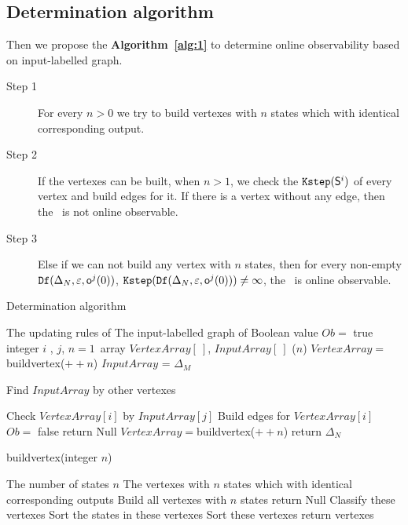  \subsection{Determination algorithm}
 Then we propose the {\bf Algorithm~\ref{alg:1}} to determine online observability based on input-labelled graph.%

\begin{description}
\item[Step 1]  For every $n>0$ we try to build vertexes with $n$ states which with identical corresponding output. 
\item[Step 2] If the vertexes can  be built, when $n>1$, we check the ${\tt Kstep}(\mathsf{S}^i)$ of every vertex and build edges for it. If there is a vertex without any edge, then the \BCN\ is not online observable.
\item[Step 3] Else if we can not build any vertex with $n$ states, then  for every non-empty ${\tt Df}(\Delta_N,\varepsilon, \mathsf{o}^{j}(0))$, ${\tt Kstep}({\tt Df}(\Delta_N,\varepsilon, \mathsf{o}^{j}(0)))\ne\infty$, the \BCN\ is online observable.
 \end{description}

\begin{algorithm}[h]
\caption{Determination algorithm}
\begin{algorithmic}[1]
\REQUIRE 
The updating rules of \BCN
\ENSURE  
The input-labelled graph of \BCN
\STATE Boolean value $Ob=$ true 
\STATE integer $i$ , $j$, $n=1$\
\STATE array $VertexArray[\ ]$, $InputArray[\ ]$
($n$)
\STATE $VertexArray=${\sf buildvertex}($++n$)
\STATE $InputArray$ = $\Delta_M$ 
\ELSE

\STATE Find $InputArray$ by other vertexes

\ENDIF
{}
\STATE Check $VertexArray[i]$ by $InputArray[j]$ 
\STATE Build edges for $VertexArray[i]$ 
\ENDFOR
{}
\STATE  $Ob=$ false 
\STATE return Null
\ENDIF
\ENDFOR
\STATE $VertexArray=${\sf buildvertex}($++n$)
\ENDWHILE
\STATE return $\Delta_N$\
\end{algorithmic}
 \label{alg:1}
\end{algorithm}
\begin{algorithm}[h!]
\caption{{\sf buildvertex}(integer $n$)}
\begin{algorithmic}[1]
\REQUIRE 
The number of states $n$
\ENSURE  
The vertexes with $n$ states which with identical corresponding outputs 
\STATE  Build all vertexes with $n$ states 
\IF{(Failed to build)} 
\STATE  return Null
\ELSE 
\STATE  Classify these vertexes
\STATE Sort the states in these vertexes
\STATE Sort these vertexes
\STATE return vertexes
\ENDIF 
\end{algorithmic}
 \label{alg:2}
\end{algorithm}

